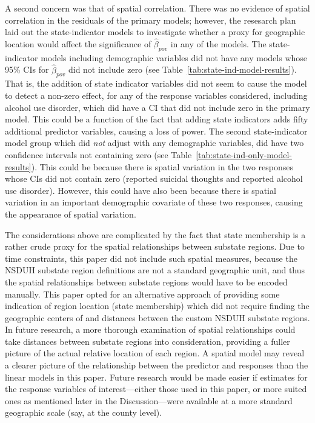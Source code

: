 \documentclass{article}
\begin{document}
A second concern was that of spatial correlation.
There was no evidence of spatial correlation in the residuals
of the primary models;
however, the resesarch plan laid out the state-indicator
models to investigate whether a proxy for geographic
location would affect the significance of
$\hat{\beta}_{pov}$
in any of the models.
The state-indicator models including demographic variables
did not have any models whose 95\% CIs for
$\hat{\beta}_{pov}$
did not include zero
(see Table~\ref{tab:state-ind-model-results}).
That is, the addition of state indicator variables did
not seem to cause the model to detect a non-zero effect,
for any of the response variables considered,
including alcohol use disorder, which did have a
CI that did not include zero in the primary model.
This could be a function of the fact that adding
state indicators adds fifty additional predictor
variables, causing a loss of power.
The second state-indicator model group
which did \textit{not} adjust with any demographic variables,
did have two confidence intervals not containing zero
(see Table~\ref{tab:state-ind-only-model-results}).
This could be because there is spatial variation
in the two responses whose CIs did not contain zero
(reported suicidal thoughts and reported alcohol use disorder).
However, this could have also been because there is
spatial variation in an important demographic covariate of
these two responses, causing the appearance of spatial variation.

The considerations above are complicated by the fact that
state membership is a rather crude proxy for the spatial relationships
between substate regions.
Due to time constraints, this paper did not include such spatial measures,
because the NSDUH substate region definitions
are not a standard geographic unit,
and thus the spatial relationships between substate regions
would have to be encoded manually.
This paper opted for an alternative approach of
providing some indication of region location (state membership)
which did not require finding the geographic centers of
and distances between the custom NSDUH substate regions.
In future research,
a more thorough examination of spatial relationships
could take distances between substate regions into consideration,
providing a fuller picture of the actual relative location
of each region.
A spatial model may reveal a clearer picture of the relationship
between the predictor and responses
than the linear models in this paper.
Future research would be made easier if estimates for
the response variables of interest---either those
used in this paper, or more suited ones as mentioned
later in the Discussion---were available
at a more standard geographic scale
(say, at the county level).
\end{document}
